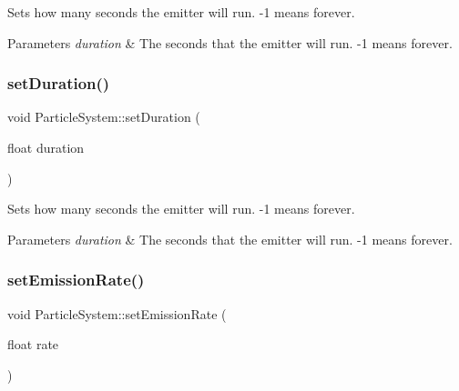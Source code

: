 Sets how many seconds the emitter will run. -\/1 means \textquotesingle{}forever\textquotesingle{}.


\begin{DoxyParams}{Parameters}
{\em duration} & The seconds that the emitter will run. -\/1 means \textquotesingle{}forever\textquotesingle{}. \\
\hline
\end{DoxyParams}
\mbox{\label{classParticleSystem_ab19b5936cb1d031282c0b6019ae4c60d}} 
\subsubsection{\texorpdfstring{set\+Duration()}{setDuration()}\hspace{0.1cm}{\footnotesize\ttfamily [2/2]}}
{\footnotesize\ttfamily void Particle\+System\+::set\+Duration (\begin{DoxyParamCaption}\item[{float}]{duration }\end{DoxyParamCaption})\hspace{0.3cm}{\ttfamily [inline]}}

Sets how many seconds the emitter will run. -\/1 means \textquotesingle{}forever\textquotesingle{}.


\begin{DoxyParams}{Parameters}
{\em duration} & The seconds that the emitter will run. -\/1 means \textquotesingle{}forever\textquotesingle{}. \\
\hline
\end{DoxyParams}
\mbox{\label{classParticleSystem_a9daefaa668017683b11e49f260f70049}} 
\subsubsection{\texorpdfstring{set\+Emission\+Rate()}{setEmissionRate()}\hspace{0.1cm}{\footnotesize\ttfamily [1/2]}}
{\footnotesize\ttfamily void Particle\+System\+::set\+Emission\+Rate (\begin{DoxyParamCaption}\item[{float}]{rate }\end{DoxyParamCaption})\hspace{0.3cm}{\ttfamily [inline]}}

